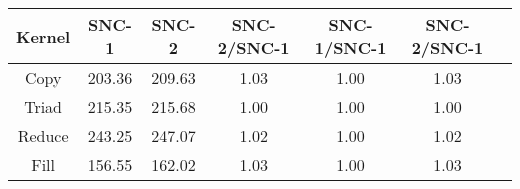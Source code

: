 \begin{tabular}{|c|c|c|c|c|c|c|}  \hline
Kernel&SNC-1&SNC-2 & SNC-2/SNC-1 & SNC-1/SNC-1 & SNC-2/SNC-1 \\ \hline 
Copy & 203.36 & 209.63  & 1.03 & 1.00 & 1.03 \\ \hline 
Triad & 215.35 & 215.68  & 1.00 & 1.00 & 1.00 \\ \hline 
Reduce & 243.25 & 247.07  & 1.02 & 1.00 & 1.02 \\ \hline 
Fill & 156.55 & 162.02  & 1.03 & 1.00 & 1.03 \\ \hline 
\end{tabular}
